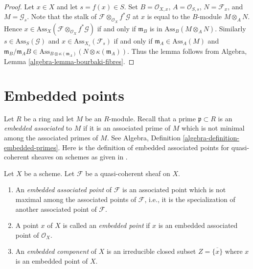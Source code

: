 \begin{proof}
Let $x \in X$ and let $s = f(x) \in S$.
Set $B = \mathcal{O}_{X, x}$, $A = \mathcal{O}_{S, s}$,
$N = \mathcal{F}_x$, and $M = \mathcal{G}_s$.
Note that the stalk of $\mathcal{F} \otimes_{\mathcal{O}_X} f^*\mathcal{G}$
at $x$ is equal to the $B$-module $M \otimes_A N$. Hence
$x \in \text{Ass}_X(\mathcal{F} \otimes_{\mathcal{O}_X} f^*\mathcal{G})$
if and only if $\mathfrak m_B$ is in $\text{Ass}_B(M \otimes_A N)$.
Similarly $s \in \text{Ass}_S(\mathcal{G})$ and
$x \in \text{Ass}_{X_s}(\mathcal{F}_s)$ if and only if
$\mathfrak m_A \in \text{Ass}_A(M)$ and
$\mathfrak m_B/\mathfrak m_A B \in
\text{Ass}_{B \otimes \kappa(\mathfrak m_A)}(N \otimes \kappa(\mathfrak m_A))$.
Thus the lemma follows from
Algebra, Lemma \ref{algebra-lemma-bourbaki-fibres}.
\end{proof}





\section{Embedded points}
\label{section-embedded}

\noindent
Let $R$ be a ring and let $M$ be an $R$-module.
Recall that a prime $\mathfrak p \subset R$ is an
{\it embedded associated} to $M$ if it is an associated prime of
$M$ which is not minimal among the associated primes of $M$. See
Algebra, Definition \ref{algebra-definition-embedded-primes}.
Here is the definition of embedded associated points
for quasi-coherent sheaves on schemes
as given in \cite[IV Definition 3.1.1]{EGA}.

\begin{definition}
\label{definition-embedded}
Let $X$ be a scheme.
Let $\mathcal{F}$ be a quasi-coherent sheaf on $X$.
\begin{enumerate}
\item An {\it embedded associated point} of $\mathcal{F}$
is an associated point which is not maximal among the
associated points of $\mathcal{F}$, i.e., it is the specialization
of another associated point of $\mathcal{F}$.
\item A point $x$ of $X$ is called an {\it embedded point}
if $x$ is an embedded associated point of $\mathcal{O}_X$.
\item An {\it embedded component} of $X$ is an irreducible
closed subset $Z = \overline{\{x\}}$ where $x$ is an embedded
point of $X$.
\end{enumerate}
\end{definition}

